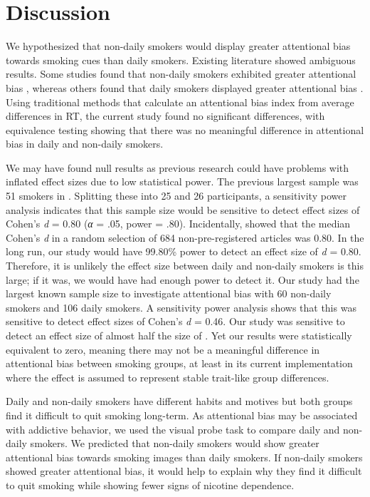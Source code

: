 \documentclass[empirical, authordate]{jote-new-article}
\begin{document}
\section{Discussion}

We hypothesized that non-daily smokers would display greater attentional bias towards smoking cues than daily smokers. Existing literature showed ambiguous results. Some studies found that non-daily smokers exhibited greater attentional bias \parencite{Bradley2003, Hogarth2003, Mogg2005}, whereas others found that daily smokers displayed greater attentional bias \parencite{Chanon2010, Vollstädt-Klein2011, Zack2001}. Using traditional methods that calculate an attentional bias index from average differences in RT, the current study found no significant differences, with equivalence testing showing that there was no meaningful difference in attentional bias in daily and non-daily smokers.

We may have found null results as previous research could have problems with inflated effect sizes due to low statistical power. The previous largest sample was 51 smokers in \textcite{Vollstädt-Klein2011}. Splitting these into 25 and 26 participants, a sensitivity power analysis indicates that this sample size would be sensitive to detect effect sizes of Cohen's \emph{d} = 0.80 (\emph{α} = .05, power = .80). Incidentally, \textcite{Schaefer2019} showed that the median Cohen's \emph{d} in a random selection of 684 non-pre-registered articles was 0.80. In the long run, our study would have 99.80\% power to detect an effect size of \emph{d} = 0.80. Therefore, it is unlikely the effect size between daily and non-daily smokers is this large; if it was, we would have had enough power to detect it. Our study had the largest known sample size to investigate attentional bias with 60 non-daily smokers and 106 daily smokers. A sensitivity power analysis shows that this was sensitive to detect effect sizes of Cohen's \emph{d} = 0.46. Our study was sensitive to detect an effect size of almost half the size of \textcite{Vollstädt-Klein2011}. Yet our results were statistically equivalent to zero, meaning there may not be a meaningful difference in attentional bias between smoking groups, at least in its current implementation where the effect is assumed to represent stable trait-like group differences.

\begin{originalPurpose}

  Daily and non-daily smokers have different habits and motives but both groups find it difficult to quit smoking long-term. As attentional bias may be associated with addictive behavior, we used the visual probe task to compare daily and non-daily smokers. We predicted that non-daily smokers would show greater attentional bias towards smoking images than daily smokers. If non-daily smokers showed greater attentional bias, it would help to explain why they find it difficult to quit smoking while showing fewer signs of nicotine dependence.

\end{originalPurpose}
\end{document}
